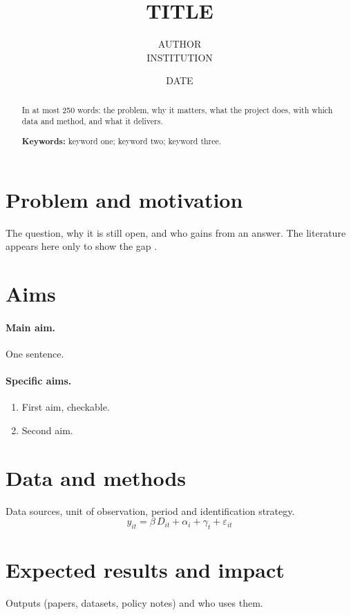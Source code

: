 \documentclass[12pt,letterpaper]{article}
\title{{{TITLE}}}
\author{{{AUTHOR}}\\{{INSTITUTION}}}
\date{{{DATE}}}
\begin{document}
\maketitle

\begin{abstract}
\noindent In at most 250 words: the problem, why it matters, what the project does, with which data and method, and what it delivers.

\medskip
\noindent\textbf{Keywords:} keyword one; keyword two; keyword three.
\end{abstract}

\section{Problem and motivation}
The question, why it is still open, and who gains from an answer. The literature appears here only to show the gap \citep{card1994minimum}.

\section{Aims}
\paragraph{Main aim.} One sentence.
\paragraph{Specific aims.}
\begin{enumerate}[nosep]
  \item First aim, checkable.
  \item Second aim.
\end{enumerate}

\section{Data and methods}
Data sources, unit of observation, period and identification strategy.
\begin{equation}
  y_{it} = \beta\, D_{it} + \alpha_i + \gamma_t + \varepsilon_{it}
\end{equation}

\section{Expected results and impact}
Outputs (papers, datasets, policy notes) and who uses them.
\end{document}
